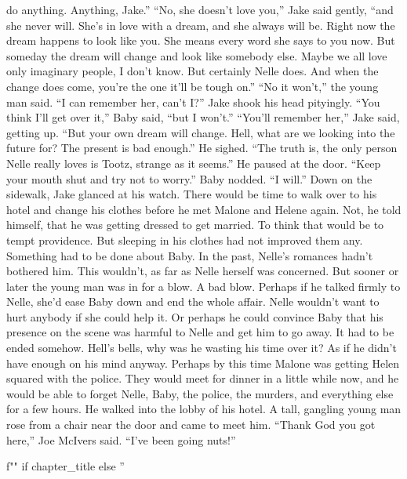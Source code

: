 \documentclass{novel}
\begin{document}
do anything. Anything, Jake.” “No, she doesn’t love you,” Jake said gently, “and she never will. She’s in love with a dream, and she always will be. Right now the dream happens to look like you. She means every word she says to you now. But someday the dream will change and look like somebody else. Maybe we all love only imaginary people, I don’t know. But certainly Nelle does. And when the change does come, you’re the one it’ll be tough on.” “No it won’t,” the young man said. “I can remember her, can’t I?” Jake shook his head pityingly. “You think I’ll get over it,” Baby said, “but I won’t.” “You’ll remember her,” Jake said, getting up. “But your own dream will change. Hell, what are we looking into the future for? The present is bad enough.” He sighed. “The truth is, the only person Nelle really loves is Tootz, strange as it seems.” He paused at the door. “Keep your mouth shut and try not to worry.” Baby nodded. “I will.” Down on the sidewalk, Jake glanced at his watch. There would be time to walk over to his hotel and change his clothes before he met Malone and Helene again. Not, he told himself, that he was getting dressed to get married. To think that would be to tempt providence. But sleeping in his clothes had not improved them any. Something had to be done about Baby. In the past, Nelle’s romances hadn’t bothered him. This wouldn’t, as far as Nelle herself was concerned. But sooner or later the young man was in for a blow. A bad blow. Perhaps if he talked firmly to Nelle, she’d ease Baby down and end the whole affair. Nelle wouldn’t want to hurt anybody if she could help it. Or perhaps he could convince Baby that his presence on the scene was harmful to Nelle and get him to go away. It had to be ended somehow. Hell’s bells, why was he wasting his time over it? As if he didn’t have enough on his mind anyway. Perhaps by this time Malone was getting Helen squared with the police. They would meet for dinner in a little while now, and he would be able to forget Nelle, Baby, the police, the murders, and everything else for a few hours. He walked into the lobby of his hotel. A tall, gangling young man rose from a chair near the door and came to meet him. “Thank God you got here,” Joe McIvers said. “I’ve been going nuts!”

\begin{ChapterStart}
\vspace{3\nbs}
f"" if chapter_title else ''
\end{ChapterStart}
\end{document}
